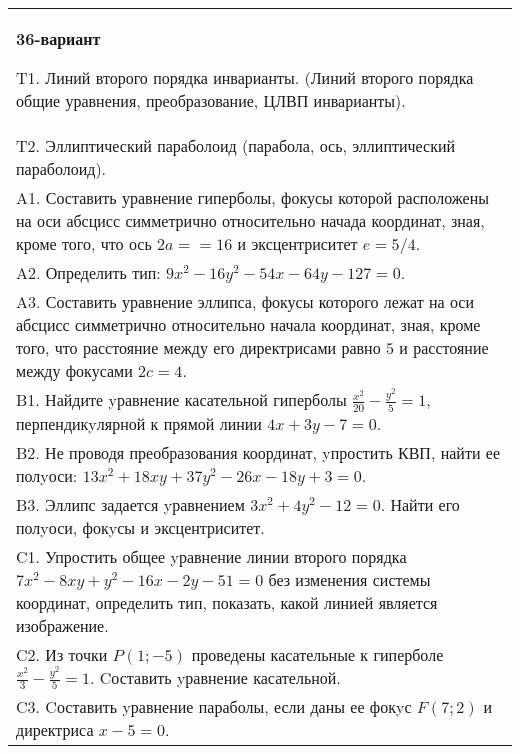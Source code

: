 \documentclass{article}
\begin{document}
\begin{tabular}{m{17cm}}
\textbf{36-вариант}
\newline

T1. Линий второго порядка инварианты. (Линий второго порядка общие уравнения, преобразование, ЦЛВП инварианты).\\

T2. Эллиптический параболоид (парабола, ось, эллиптический параболоид).\\

A1. Составить уравнение гиперболы, фокусы которой расположены на оси абсцисс симметрично относительно начада координат, зная, кроме того, что ось $2a==16$ и эксцентриситет $e=5/4$.\\

A2. Определить тип: $9x^{2}-16y^{2}-54x-64y-127=0$.\\

A3. Составить уравнение эллипса, фокусы которого лежат на оси абсцисс симметрично относительно начала координат, зная, кроме того, что расстояние между его директрисами равно $5$ и расстояние между фокусами $2c=4$.\\

B1. Найдите yравнение касательной гиперболы $\frac{x^{2}}{20} - \frac{y^{2}}{5} = 1$, перпендикyлярной к прямой линии $4x + 3y - 7 = 0$.  \\

B2. Не проводя преобразования координат, yпростить КВП, найти ее полyоси: $13x^{2} + 18xy + 37y^{2} - 26x - 18y + 3 = 0$.  \\

B3. Эллипс задается yравнением $3x^{2} + 4y^{2} - 12 = 0$. Найти его полyоси, фокyсы и эксцентриситет.  \\

C1. Упростить общее yравнение линии второго порядка $7x^{2}-8xy+y^{2}-16x-2y-51=0$ без изменения системы координат, определить тип, показать, какой линией является изображение.\\

C2. Из точки $P(1;-5)$ проведены касательные к гиперболе $\frac{x^{2}}{3}-\frac{y^{2}}{5}=1$. Cоставить yравнение касательной.\\

C3. Cоставить yравнение параболы, если даны ее фокyс $F(7;2)$ и директриса $x-5=0$.  \\

\end{tabular}
\vspace{1cm}
\end{document}
